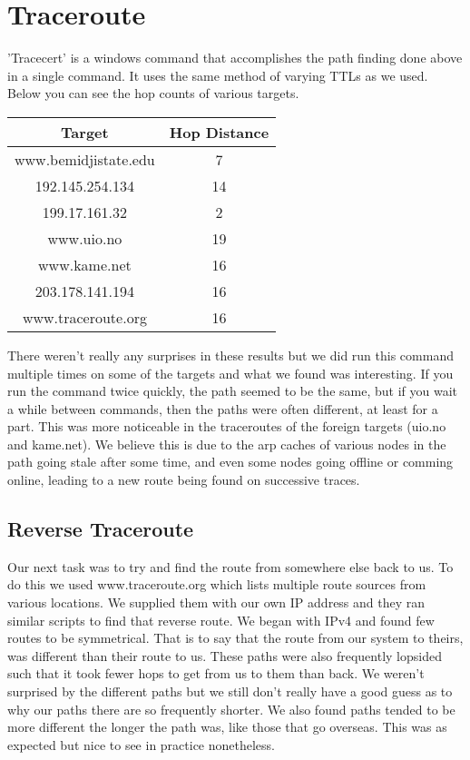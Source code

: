 \documentclass[prb,preprint]{revtex4-1}
\begin{document}
\section{Traceroute}
'Tracecert' is a windows command that accomplishes the path finding done above in a single command. It uses the same method of varying TTLs as we used. Below you can see the hop counts of various targets.
\begin{center}
    \begin{tabular}{||c|c||}
    \hline
    Target & Hop Distance\\
    \hline
    www.bemidjistate.edu & 7 \\
    \hline
    192.145.254.134 & 14 \\
    \hline
    199.17.161.32 & 2 \\
    \hline
    www.uio.no & 19 \\
    \hline
    www.kame.net & 16\\
    \hline
    203.178.141.194 & 16 \\
    \hline
    www.traceroute.org & 16 \\
    \hline
    \end{tabular}
\end{center}

There weren't really any surprises in these results but we did run this command multiple times on some of the targets and what we found was interesting. If you run the command twice quickly, the path seemed to be the same, but if you wait a while between commands, then the paths were often different, at least for a part. This was more noticeable in the traceroutes of the foreign targets (uio.no and kame.net). We believe this is due to the arp caches of various nodes in the path going stale after some time, and even some nodes going offline or comming online, leading to a new route being found on successive traces.

\subsection{Reverse Traceroute}
Our next task was to try and find the route from somewhere else back to us. To do this we used www.traceroute.org which lists multiple route sources from various locations. We supplied them with our own IP address and they ran similar scripts to find that reverse route. We began with IPv4 and found few routes to be symmetrical. That is to say that the route from our system to theirs, was different than their route to us. These paths were also frequently lopsided such that it took fewer hops to get from us to them than back. We weren't surprised by the different paths but we still don't really have a good guess as to why our paths there are so frequently shorter. We also found paths tended to be more different the longer the path was, like those that go overseas. This was as expected but nice to see in practice nonetheless.
\end{document}

